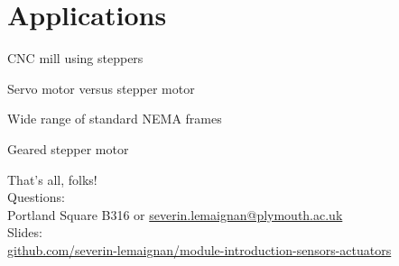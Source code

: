 \documentclass[compress]{beamer}
\begin{document}
\section{Applications}

{
    \begin{frame}{CNC mill using steppers}
    \end{frame}
}


{
    \begin{frame}{Servo motor versus stepper motor}
    \end{frame}
}

{
    \begin{frame}{Wide range of standard NEMA frames}
    \end{frame}
}

{
    \begin{frame}{Geared stepper motor}
    \end{frame}
}


\begin{frame}{}
    \begin{center}
        \Large
        That's all, folks!\\[2em]
        \normalsize
        Questions:\\
        Portland Square B316 or \url{severin.lemaignan@plymouth.ac.uk} \\[1em]

        Slides:\\
        \href{https://github.com/severin-lemaignan/module-introduction-sensors-actuators}{\small
        github.com/severin-lemaignan/module-introduction-sensors-actuators}


    \end{center}
\end{frame}
\end{document}
